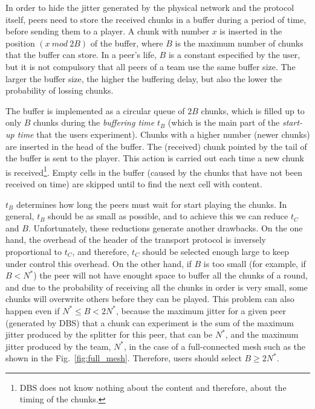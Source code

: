 

\label{sec:buffering_chunks}

In order to hide the jitter generated by the physical network and the
protocol itself, peers need to store the received chunks in a buffer
during a period of time, before sending them to a player. A chunk with
number $x$ is inserted in the position $(x~\mathit{mod}~2B)$ of the
buffer, where $B$ is the maximum number of chunks that the buffer can
store. In a peer's life, $B$ is a constant especified by the user, but
it is not compulsory that all peers of a team use the same buffer
size. The larger the buffer size, the higher the buffering delay, but
also the lower the probability of lossing chunks.

The buffer is implemented as a circular queue of $2B$ chunks, which is
filled up to only $B$ chunks during the \emph{buffering time} $t_B$
(which is the main part of the \emph{start-up time} that the users
experiment). Chunks with a higher number (newer chunks) are inserted
in the head of the buffer. The (received) chunk pointed by the tail of
the buffer is sent to the player. This action is carried out each time
a new chunk is received\footnote{DBS does not know nothing about the
  content and therefore, about the timing of the chunks.}. Empty cells
in the buffer (caused by the chunks that have not been received on
time) are skipped until to find the next cell with content.

$t_B$ determines how long the peers must wait for start playing the
chunks. In general, $t_B$ should be as small as possible, and to
achieve this we can reduce $t_C$ and $B$. Unfortunately, these
reductions generate another drawbacks. On the one hand, the overhead
of the header of the transport protocol is inversely proportional to
$t_C$, and therefore, $t_C$ should be selected enough large to keep
under control this overhead. On the other hand, if $B$ is too small
(for example, if $B<N^*$) the peer will not have enought space to
buffer all the chunks of a round, and due to the probability of
receiving all the chunks in order is very small, some chunks will
overwrite others before they can be played. This problem can also
happen even if $N^*\leq B<2N^*$, because the maximum jitter for a
given peer (generated by DBS) that a chunk can experiment is the sum
of the maximum jitter produced by the splitter for this peer, that can
be $N^*$, and the maximum jitter produced by the team, $N^*$, in the
case of a full-connected mesh such as the shown in the
Fig.~\ref{fig:full_mesh}. Therefore, users should select $B\ge 2N^*$.

